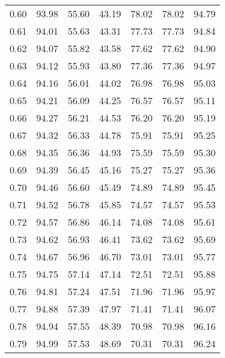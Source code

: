 \begin{tabular}{|c|c|c|c|c|c|c|}
      0.60 &     93.98 &     55.60 &      43.19 &   78.02 &      78.02 &         94.79 \\
      0.61 &     94.01 &     55.63 &      43.31 &   77.73 &      77.73 &         94.84 \\
      0.62 &     94.07 &     55.82 &      43.58 &   77.62 &      77.62 &         94.90 \\
      0.63 &     94.12 &     55.93 &      43.80 &   77.36 &      77.36 &         94.97 \\
      0.64 &     94.16 &     56.01 &      44.02 &   76.98 &      76.98 &         95.03 \\
      0.65 &     94.21 &     56.09 &      44.25 &   76.57 &      76.57 &         95.11 \\
      0.66 &     94.27 &     56.21 &      44.53 &   76.20 &      76.20 &         95.19 \\
      0.67 &     94.32 &     56.33 &      44.78 &   75.91 &      75.91 &         95.25 \\
      0.68 &     94.35 &     56.36 &      44.93 &   75.59 &      75.59 &         95.30 \\
      0.69 &     94.39 &     56.45 &      45.16 &   75.27 &      75.27 &         95.36 \\
      0.70 &     94.46 &     56.60 &      45.49 &   74.89 &      74.89 &         95.45 \\
      0.71 &     94.52 &     56.78 &      45.85 &   74.57 &      74.57 &         95.53 \\
      0.72 &     94.57 &     56.86 &      46.14 &   74.08 &      74.08 &         95.61 \\
      0.73 &     94.62 &     56.93 &      46.41 &   73.62 &      73.62 &         95.69 \\
      0.74 &     94.67 &     56.96 &      46.70 &   73.01 &      73.01 &         95.77 \\
      0.75 &     94.75 &     57.14 &      47.14 &   72.51 &      72.51 &         95.88 \\
      0.76 &     94.81 &     57.24 &      47.51 &   71.96 &      71.96 &         95.97 \\
      0.77 &     94.88 &     57.39 &      47.97 &   71.41 &      71.41 &         96.07 \\
      0.78 &     94.94 &     57.55 &      48.39 &   70.98 &      70.98 &         96.16 \\
      0.79 &     94.99 &     57.53 &      48.69 &   70.31 &      70.31 &         96.24 \\

\end{tabular}

